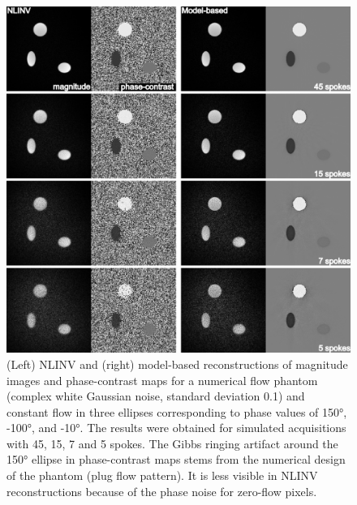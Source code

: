 \begin{figure}[h!]
  \centering
  \includegraphics[width=\textwidth]{fig/mir-pc-sim-pha.png}
  \caption{(Left) NLINV and (right) model-based reconstructions of magnitude images and phase-contrast maps for a numerical flow phantom (complex white Gaussian noise, standard deviation \num{0.1}) and constant flow in three ellipses corresponding to phase values of \ang{150}, \ang{-100}, and \ang{-10}. The results were obtained for simulated acquisitions with \num{45}, \num{15}, \num{7} and \num{5} spokes. The Gibbs ringing artifact around the \ang{150} ellipse in phase-contrast maps stems from the numerical design of the phantom (plug flow pattern). It is less visible in NLINV reconstructions because of the phase noise for zero-flow pixels.} \label{Fig:mir-pc-sim-pha}
\end{figure}

